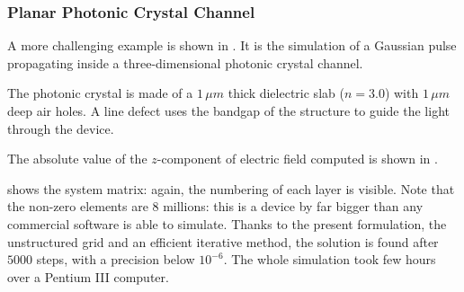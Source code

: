 \subsubsection{Planar Photonic Crystal Channel}

A more challenging example is shown in
. It is the simulation of a Gaussian
pulse propagating inside a three-dimensional photonic crystal channel.

The photonic crystal is made of a $1\,\mu m$ thick dielectric slab ($n
= 3.0$) with $1\,\mu m$ deep air holes. A line defect uses the bandgap
of the structure to guide the light through the device.

The absolute value of the $z$-component of electric field computed is
shown in .

 shows the system matrix: again, the
numbering of each layer is visible. Note that the non-zero elements
are $8$ millions: this is a device by far bigger than any commercial
software is able to simulate. Thanks to the present formulation, the
unstructured grid and an efficient iterative method, the solution is
found after $5000$ steps, with a precision below $10^{-6}$. The whole
simulation took few hours over a Pentium III computer.

